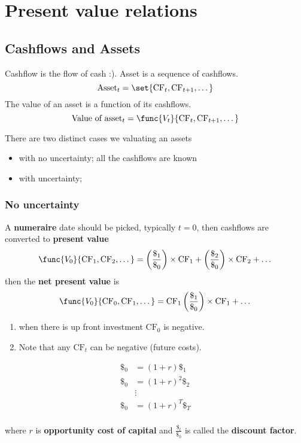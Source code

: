 \chapter{Present value relations}
\section{Cashflows and Assets}
Cashflow is the flow of cash :). Asset is a sequence of cashflows.
\begin{equation*}
    \text{Asset}_t = \set{\text{CF}_t , \text{CF}_{t+1} , \dots }
\end{equation*}
The value of an asset is a function of its cashflows.
\begin{equation*}
    \text{Value of asset}_t = \func{V_t}{\text{CF}_t , \text{CF}_{t+1} , \dots}
\end{equation*}

There are two distinct cases we valuating an assets
\begin{itemize}
    \item with no uncertainty; all the cashflows are known
    \item with uncertainty;
\end{itemize}
\subsection{No uncertainty}
A \textbf{numeraire} date should be picked, typically \(t = 0\), then cashflows are converted to \textbf{present value}
\begin{equation*}
    \func{V_0}{\text{CF}_1 , \text{CF}_{2} , \dots} = \left(\dfrac{\$_1}{\$_0} \right)\times \text{CF}_1  + \left(\dfrac{\$_2}{\$_0} \right)\times \text{CF}_2 + \dots
\end{equation*}
then the \textbf{net present value} is
\begin{equation*}
    \func{V_0}{\text{CF}_0 , \text{CF}_{1} , \dots} = \text{CF}_1 \left(\dfrac{\$_1}{\$_0} \right)\times \text{CF}_1  +  \dots
\end{equation*}
\begin{enumerate}
    \item when there is up front investment \(\text{CF}_0\) is negative.
    \item Note that any \(\text{CF}_t\) can be negative (future costs).
\end{enumerate}

\begin{align*}
    \$_0 & = (1 + r) \$_1   \\
    \$_0 & = (1 + r)^2 \$_2 \\
         & \vdots           \\
    \$_0 & = (1 + r)^T \$_T \\
\end{align*}

where \(r\) is \textbf{opportunity cost of capital} and \(\frac{\$_t}{\$_0}\) is called the \textbf{discount factor}.